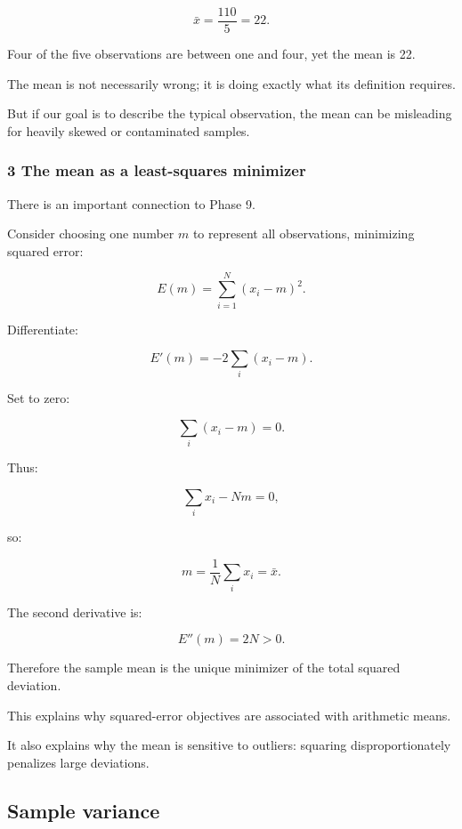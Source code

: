 \[
 \bar x=\frac{110}{5}=\boxed{22}.
\]

Four of the five observations are between one and four, yet the mean is 22.

The mean is not necessarily wrong; it is doing exactly what its definition requires.

But if our goal is to describe the typical observation, the mean can be misleading for heavily skewed or contaminated samples.

\subsubsection{3 The mean as a least-squares minimizer}\label{02-foundations-ii-ch030-the-mean-as-a-least-squares-minimizer}

\hypertarget{02-foundations-ii-ch030-the-mean-as-a-least-squares-minimizer}{}

There is an important connection to Phase 9.

Consider choosing one number \(m\) to represent all observations, minimizing squared error:

\[
 E(m)= \sum_{i=1}^{N}(x_i-m)^2.
\]

Differentiate:

\[
 E'(m)= -2\sum_i(x_i-m).
\]

Set to zero:

\[
 \sum_i(x_i-m)=0.
\]

Thus:

\[
 \sum_ix_i-Nm=0,
\]

so:

\[
 \boxed{ m=\frac1N\sum_ix_i=\bar x }.
\]

The second derivative is:

\[
 E''(m)=2N>0.
\]

Therefore the sample mean is the unique minimizer of the total squared deviation.

This explains why squared-error objectives are associated with arithmetic means.

It also explains why the mean is sensitive to outliers: squaring disproportionately penalizes large deviations.

\subsection{Sample variance}\label{02-foundations-ii-ch030-sample-variance}

\hypertarget{02-foundations-ii-ch030-sample-variance}{}

